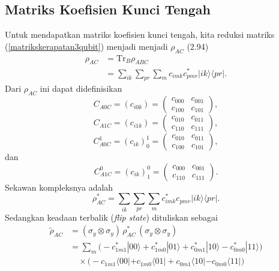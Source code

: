 \subsection{Matriks Koefisien Kunci Tengah}
Untuk mendapatkan matriks koefisien kunci tengah, kita reduksi matriks (\ref{matrikskerapatan3qubit}) menjadi menjadi $\rho_{AC}$ (2.94)
\begin{equation}
	\begin{aligned}
		\rho_{AC}
		&=\mathrm{Tr}_B\rho_{ABC}\\
		&= \sum_{i k} \sum_{p r}\sum_m
		c_{i m k} c^{*}_{p m r}
		| i k \rangle \langle p r|.
	\end{aligned}
\end{equation}
Dari $\rho_{AC}$ ini dapat didefinisikan
\begin{equation}
	C_{A0C}=(c_{i0k})=
	\begin{pmatrix}
		c_{000} & c_{001} \\
		c_{100} & c_{101}
	\end{pmatrix},
\end{equation}
\begin{equation}
	C_{A1C}=(c_{i1k})=
	\begin{pmatrix}
		c_{010} & c_{011} \\
		c_{110} & c_{111}
	\end{pmatrix},
\end{equation}
\begin{equation}
	C_{A0C}^1=(c_{ik})_0^1=
	\begin{pmatrix}
		c_{010} & c_{011} \\
		c_{100} & c_{101}
	\end{pmatrix},
\end{equation}
dan
\begin{equation}
	C_{A1C}^0=(c_{ik})_1^0=
	\begin{pmatrix}
		c_{000} & c_{001} \\
		c_{110} & c_{111}
	\end{pmatrix}.
\end{equation}
Sekawan kompleksnya adalah
\begin{equation}
	\rho^{*}_{AC}
	= \sum_{i k} \sum_{p r} \sum_m
	c^{*}_{i m k} c_{p m r}
	| i k \rangle \langle p r |.
\end{equation}
Sedangkan keadaan terbalik (\textit{flip state}) dituliskan sebagai
\begin{equation}
	\begin{aligned}
		\tilde{\rho}_{AC}
		&= (\sigma_y \otimes \sigma_y)\,
		\rho^{*}_{AC}\,
		(\sigma_y \otimes \sigma_y) \\
		&= \sum_m
		\Big(
		- c^{*}_{1m1} |00\rangle
		+ c^{*}_{1m0} |01\rangle
		+ c^{*}_{0m1} |10\rangle
		- c^{*}_{0m0} |11\rangle
		\Big) \\
		&\quad \times
		\Big(
		- c_{1m1} \langle 00|
		+ c_{1m0} \langle 01|
		+ c_{0m1} \langle 10|
		- c_{0m0} \langle 11|
		\Big)
	\end{aligned}
\end{equation}
